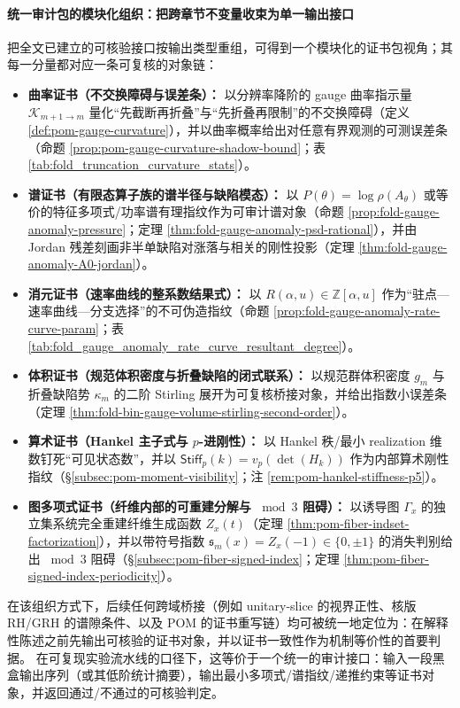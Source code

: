 \paragraph{统一审计包的模块化组织：把跨章节不变量收束为单一输出接口}
把全文已建立的可核验接口按输出类型重组，可得到一个模块化的证书包视角；其每一分量都对应一条可复核的对象链：
\begin{itemize}
  \item \textbf{曲率证书（不交换障碍与误差条）：}
  以分辨率降阶的 gauge 曲率指示量 \(\mathcal K_{m+1\to m}\) 量化“先截断再折叠”与“先折叠再限制”的不交换障碍（定义 \ref{def:pom-gauge-curvature}），并以曲率概率给出对任意有界观测的可测误差条（命题 \ref{prop:pom-gauge-curvature-shadow-bound}；表 \ref{tab:fold_truncation_curvature_stats}）。
  \item \textbf{谱证书（有限态算子族的谱半径与缺陷模态）：}
  以 \(P(\theta)=\log\rho(A_\theta)\) 或等价的特征多项式/功率谱有理指纹作为可审计谱对象（命题 \ref{prop:fold-gauge-anomaly-pressure}；定理 \ref{thm:fold-gauge-anomaly-psd-rational}），并由 Jordan 残差刻画非半单缺陷对涨落与相关的刚性投影（定理 \ref{thm:fold-gauge-anomaly-A0-jordan}）。
  \item \textbf{消元证书（速率曲线的整系数结果式）：}
  以 \(R(\alpha,u)\in\mathbb Z[\alpha,u]\) 作为“驻点—速率曲线—分支选择”的不可伪造指纹（命题 \ref{prop:fold-gauge-anomaly-rate-curve-param}；表 \ref{tab:fold_gauge_anomaly_rate_curve_resultant_degree}）。
  \item \textbf{体积证书（规范体积密度与折叠缺陷的闭式联系）：}
  以规范群体积密度 \(g_m\) 与折叠缺陷势 \(\kappa_m\) 的二阶 Stirling 展开为可复核桥接对象，并给出指数小误差条（定理 \ref{thm:fold-bin-gauge-volume-stirling-second-order}）。
  \item \textbf{算术证书（Hankel 主子式与 \texorpdfstring{$p$}{p}-进刚性）：}
  以 Hankel 秩/最小 realization 维数钉死“可见状态数”，并以 \(\mathsf{Stiff}_p(k)=v_p(\det(H_k))\) 作为内部算术刚性指纹（\S\ref{subsec:pom-moment-visibility}；注 \ref{rem:pom-hankel-stiffness-p5}）。
  \item \textbf{图多项式证书（纤维内部的可重建分解与 \texorpdfstring{$\bmod 3$}{mod 3} 阻碍）：}
  以诱导图 \(\Gamma_x\) 的独立集系统完全重建纤维生成函数 \(Z_x(t)\)（定理 \ref{thm:pom-fiber-indset-factorization}），并以带符号指数 \(\mathfrak{s}_m(x)=Z_x(-1)\in\{0,\pm 1\}\) 的消失判别给出 \(\bmod 3\) 阻碍（\S\ref{subsec:pom-fiber-signed-index}；定理 \ref{thm:pom-fiber-signed-index-periodicity}）。
\end{itemize}
在该组织方式下，后续任何跨域桥接（例如 unitary-slice 的视界正性、核版 RH/GRH 的谱隙条件、以及 POM 的证书重写链）均可被统一地定位为：在解释性陈述之前先输出可核验的证书对象，并以证书一致性作为机制等价性的首要判据。
在可复现实验流水线的口径下，这等价于一个统一的审计接口：输入一段黑盒输出序列（或其低阶统计摘要），输出最小多项式/谱指纹/递推约束等证书对象，并返回通过/不通过的可核验判定。

